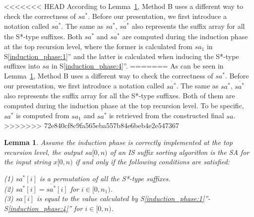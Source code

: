 \documentclass[10pt,journal,compsoc]{IEEEtran}
\newtheorem{lemma}[theorem]{Lemma}
\begin{document}
<<<<<<< HEAD
According to Lemma~\ref{lemma:4}, Method B uses a different way to check the correctness of $sa^*$. Before our presentation, we first introduce a notation called $\overline{sa^*}$. The same as $sa^*$, $\overline{sa^*}$ also represents the suffix array for all the S*-type suffixes. Both $sa^*$ and $\overline{sa^*}$ are computed during the induction phase at the top recursion level, where the former is calculated from $sa_1$ in S\ref{induction_phase:1}'' and the latter is calculated when inducing the S*-type suffixes into $sa$ in S\ref{induction_phase:4}''. 
=======
As can be seen in Lemma~\ref{lemma:4}, Method B uses a different way to check the correctness of $sa^*$. Before our presentation, we first introduce a notation called $\overline{sa^*}$. The same as $sa^*$, $\overline{sa^*}$ also represents the suffix array for all the S*-type suffixes. Both of them are computed during the induction phase at the top recursion level. To be specific, $sa^*$ is computed from $sa_1$ and $\overline{sa^*}$ is retrieved from the constructed final $sa$.
>>>>>>> 72e840cf8c9fa565eba557b84e6beb4e2e547367

\begin{lemma} \label{lemma:4}
    Assume the induction phase is correctly implemented at the top recursion level, the output $sa[0, n)$ of an IS suffix sorting algorithm is the SA for the input string $x[0, n)$ if and only if the following conditions are satisfied:

	(1) $sa^*[i]$ is a permutation of all the S*-type suffixes. \\
	(2) $sa^*[i] = \overline{sa^*}[i]$ for $i \in [0, n_1)$. \\
	(3) $sa[i]$ is equal to the value calculated by S\ref{induction_phase:1}''-S\ref{induction_phase:4}'' for $i \in [0, n)$. \\

\end{lemma}
\end{document}
